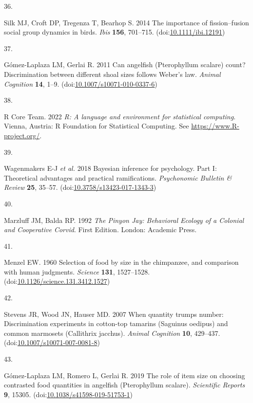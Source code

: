 \documentclass[
  ,pub,floatsintext]{apa6}
\newlength{\cslhangindent}
\newlength{\csllabelwidth}
\newlength{\cslentryspacingunit} %
\newenvironment{CSLReferences}[2] %
 {%
  \setlength{\parindent}{0pt}
  \ifodd #1
  \let\oldpar\par
  \def\par{\hangindent=\cslhangindent\oldpar}
  \fi
  \setlength{\parskip}{#2\cslentryspacingunit}
 }%
 {}
\newcommand{\CSLLeftMargin}[1]{\parbox[t]{\csllabelwidth}{#1}}
\newcommand{\CSLRightInline}[1]{\parbox[t]{\linewidth - \csllabelwidth}{#1}\break}
\begin{document}
\begin{CSLReferences}{0}{0}
\leavevmode{}%
\CSLLeftMargin{36. }%
\CSLRightInline{Silk MJ, Croft DP, Tregenza T, Bearhop S. 2014 The importance of fission--fusion social group dynamics in birds. \emph{Ibis} \textbf{156}, 701--715. (doi:\href{https://doi.org/10.1111/ibi.12191}{10.1111/ibi.12191})}

\leavevmode{}%
\CSLLeftMargin{37. }%
\CSLRightInline{Gómez-Laplaza LM, Gerlai R. 2011 Can angelfish ({Pterophyllum} scalare) count? {Discrimination} between different shoal sizes follows {Weber}'s law. \emph{Animal Cognition} \textbf{14}, 1--9. (doi:\href{https://doi.org/10.1007/s10071-010-0337-6}{10.1007/s10071-010-0337-6})}

\leavevmode{}%
\CSLLeftMargin{38. }%
\CSLRightInline{R Core Team. 2022 \emph{R: A language and environment for statistical computing}. Vienna, Austria: R Foundation for Statistical Computing. See \url{https://www.R-project.org/}.}

\leavevmode{}%
\CSLLeftMargin{39. }%
\CSLRightInline{Wagenmakers E-J \emph{et al.} 2018 Bayesian inference for psychology. {Part} {I}: {Theoretical} advantages and practical ramifications. \emph{Psychonomic Bulletin \& Review} \textbf{25}, 35--57. (doi:\href{https://doi.org/10.3758/s13423-017-1343-3}{10.3758/s13423-017-1343-3})}

\leavevmode{}%
\CSLLeftMargin{40. }%
\CSLRightInline{Marzluff JM, Balda RP. 1992 \emph{The {Pinyon} {Jay}: {Behavioral} {Ecology} of a {Colonial} and {Cooperative} {Corvid}}. First Edition. London: Academic Press. }

\leavevmode{}%
\CSLLeftMargin{41. }%
\CSLRightInline{Menzel EW. 1960 Selection of food by size in the chimpanzee, and comparison with human judgments. \emph{Science} \textbf{131}, 1527--1528. (doi:\href{https://doi.org/10.1126/science.131.3412.1527}{10.1126/science.131.3412.1527})}

\leavevmode{}%
\CSLLeftMargin{42. }%
\CSLRightInline{Stevens JR, Wood JN, Hauser MD. 2007 When quantity trumps number: Discrimination experiments in cotton-top tamarins ({Saguinus} oedipus) and common marmosets ({Callithrix} jacchus). \emph{Animal Cognition} \textbf{10}, 429--437. (doi:\href{https://doi.org/10.1007/s10071-007-0081-8}{10.1007/s10071-007-0081-8})}

\leavevmode{}%
\CSLLeftMargin{43. }%
\CSLRightInline{Gómez-Laplaza LM, Romero L, Gerlai R. 2019 The role of item size on choosing contrasted food quantities in angelfish ({Pterophyllum} scalare). \emph{Scientific Reports} \textbf{9}, 15305. (doi:\href{https://doi.org/10.1038/s41598-019-51753-1}{10.1038/s41598-019-51753-1})}

\end{CSLReferences}
\end{document}
